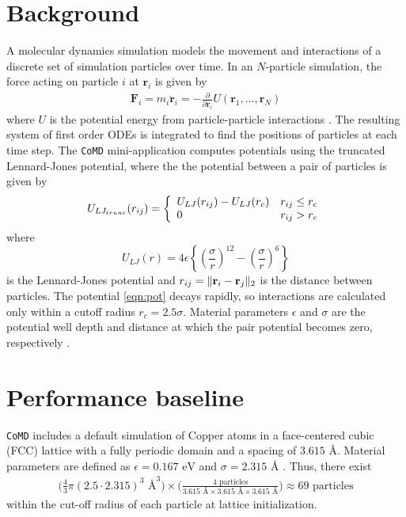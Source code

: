 \documentclass[12pt]{article}
\renewcommand{\v}[1]{\bold{#1}}
\begin{document}
\section{Background}
A molecular dynamics simulation models the movement and interactions
of a discrete set of simulation particles over time. In an
$N$-particle simulation, the force acting on particle $i$ at
$\bm{r}_i$ is given by
\begin{align*}
    \textbf{F}_i = m_i \ddot{\bm{r}}_i = -\frac{\partial}{\partial \bm{r}_i} U(\bm{r}_1, \dots, \bm{r}_N)
\end{align*}
where $U$ is the potential energy from particle-particle interactions
\cite{Intro}.  The resulting system of first order ODEs is integrated
to find the positions of particles at each time step. The
\texttt{CoMD} mini-application computes potentials using the truncated
Lennard-Jones potential, where the the potential between a pair of
particles is given by
\begin{equation}
U_{LJ_{trunc}}(r_{ij}) = 
\left\{ \begin{array}{l c} 
     U_{LJ}(r_{ij}) - U_{LJ}(r_c) & r_{ij} \le r_c \\
     0 & r_{ij} > r_c
        \end{array} \right.
      \label{eqn:pot}
\end{equation}
where
\begin{equation}
    U_{LJ}(r) = 
    4 \epsilon \left\{ \left(\frac{\sigma}{r}\right)^{12} - 
    \left(\frac{\sigma}{r}\right)^6 \right\}
\end{equation}
is the Lennard-Jones potential and $r_{ij} = \|\v{r}_i-\v{r}_j\|_2$ is
the distance between particles. The potential \ref{eqn:pot} decays
rapidly, so interactions are calculated only within a cutoff radius
$r_c = 2.5 \sigma$. Material parameters $\epsilon$ and $\sigma$ are
the potential well depth and distance at which the pair potential
becomes zero, respectively \cite{Wiki}.

\section{Performance baseline}
\texttt{CoMD} includes a default simulation of Copper atoms in a face-centered 
cubic (FCC) lattice with a fully periodic domain and a spacing of $3.615 \text{ \AA}$.
Material parameters are defined as $\epsilon = 0.167 \text{ eV}$ and $\sigma = 2.315 \text{ \AA}$ 
\cite{CoMD}. Thus, there exist
\begin{align}
     \bigg( \frac{4}{3} \pi (2.5 \cdot 2.315)^3 \text{ \AA}^3 \bigg) \times
     \bigg( \frac{4 \text{ particles}}{3.615 \text{ \AA} \times 3.615 \text{ \AA} \times 3.615 \text{ \AA}} \bigg)
     \approx 69 \text{ particles}
\end{align}
within the cut-off radius of each particle at lattice initialization. \\
\end{document}
